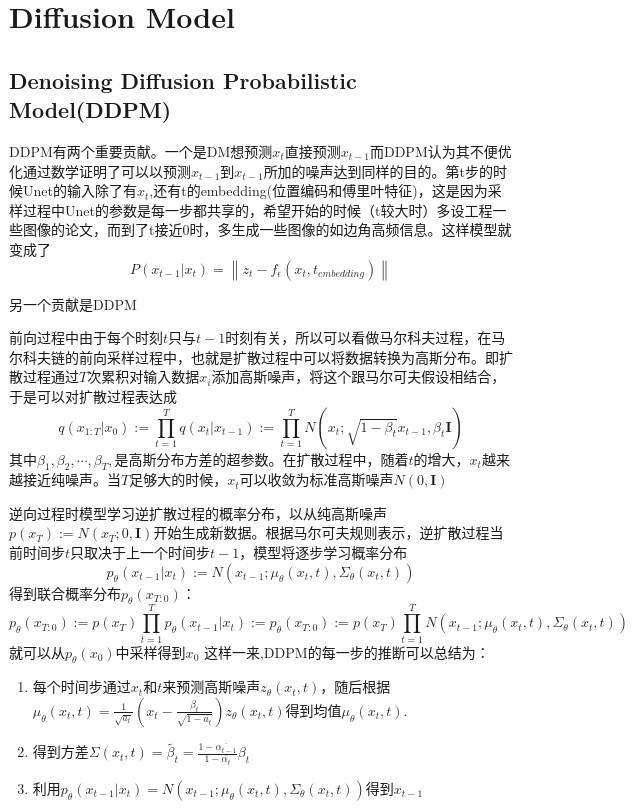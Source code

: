 \documentclass[12pt, a4paper, oneside]{ctexart}
\begin{document}
\section{Diffusion Model}
\par

\subsection{Denoising Diffusion Probabilistic Model(DDPM)}
\par
DDPM有两个重要贡献。一个是DM想预测$x_t$直接预测$x_{t-1}$而DDPM认为其不便优化通过数学证明了可以以预测$x_{t-1}$到$x_{t-1}$所加的噪声达到同样的目的。第t步的时候Unet的输入除了有$x_t$,还有t的embedding(位置编码和傅里叶特征)，这是因为采样过程中Unet的参数是每一步都共享的，希望开始的时候（t较大时）多设工程一些图像的论文，而到了t接近0时，多生成一些图像的如边角高频信息。这样模型就变成了
$$P(x_{t-1}|x_t)=\left\|   z_t-f_{\epsilon}(x_t,t_{embedding})  \right\|$$
\par
另一个贡献是DDPM 

前向过程中由于每个时刻$t$只与$t-1$时刻有关，所以可以看做马尔科夫过程，在马尔科夫链的前向采样过程中，也就是扩散过程中可以将数据转换为高斯分布。即扩散过程通过$T$次累积对输入数据$x_i$添加高斯噪声，将这个跟马尔可夫假设相结合，于是可以对扩散过程表达成
$$q(x_{1:T}|x_0):=  \prod_{t=1}^T{q(x_t|x_{t-1})}:= \prod_{t=1}^T{N(x_t; \sqrt{1-{\beta}_t}x_{t-1},{\beta}_t \boldsymbol{I})}$$ 
其中${\beta}_1,{\beta}_2,\cdots,{\beta}_T,$是高斯分布方差的超参数。在扩散过程中，随着$t$的增大，$x_t$越来越接近纯噪声。当$T$足够大的时候，$x_t$可以收敛为标准高斯噪声$N(0,\boldsymbol{I})$
\par
逆向过程时模型学习逆扩散过程的概率分布，以从纯高斯噪声$p(x_T):=N(x_T;0,\boldsymbol{I})$开始生成新数据。根据马尔可夫规则表示，逆扩散过程当前时间步$t$只取决于上一个时间步$t-1$，模型将逐步学习概率分布
$$p_{\theta}(x_{t-1}|x_t) :=N(x_{t-1};{\mu}_{\theta}(x_t,t),{\Sigma}_{\theta}(x_t,t))$$
得到联合概率分布$p_{\theta}(x_{T:0})$：
$$p_{\theta}(x_{T:0}):=p(x_T) \prod_{t=1}^T{p_{\theta}(x_{t-1}|x_t)} :=p_{\theta}(x_{T:0}):=p(x_T) \prod_{t=1}^T{N(x_{t-1};{\mu}_{\theta}(x_t,t),{\Sigma}_{\theta}(x_t,t))}$$
就可以从$p_\theta(x_0)$中采样得到$x_0$
这样一来,DDPM的每一步的推断可以总结为：
 
\begin{enumerate} 
    \item 每个时间步通过$x_t$和$t$来预测高斯噪声$z_{\theta}(x_t,t)$，随后根据${\mu}_{\theta}(x_t,t)=\frac{1}{\sqrt{a_t}}(x_t-\frac{{\beta}_t}{\sqrt{1-\overline{a_t}}})z_{\theta}(x_t,t)$得到均值${\mu}_{\theta}(x_t,t)$.
    \item 得到方差$\Sigma(x_t,t)= \widetilde{{\beta}_t}=\frac{1-\overline{{\alpha}_{t-1}}}{1-\overline{{\alpha}_t}}{\beta}_t$
    \item 利用$p_{\theta}(x_{t-1}|x_t) =N(x_{t-1};{\mu}_{\theta}(x_t,t),{\Sigma}_{\theta}(x_t,t))$得到$x_{t-1}$
\end{enumerate}
\end{document}
